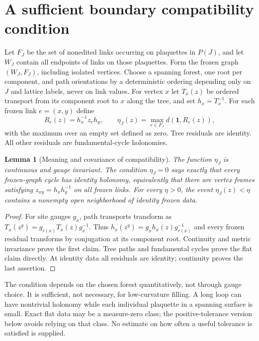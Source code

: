 \documentclass[11pt]{article}
\newtheorem{lemma}[theorem]{Lemma}
\theoremstyle{definition}
\theoremstyle{remark}
\newcommand{\one}{\mathbf1}
\begin{document}
\section{A sufficient boundary compatibility condition}
Let $F_J$ be the set of nonedited links occurring on plaquettes in $P(J)$,
and let $W_J$ contain all endpoints of links on those plaquettes. Form the
frozen graph $(W_J,F_J)$, including isolated vertices. Choose a spanning
forest, one root per component, and path orientations by a deterministic
ordering depending only on $J$ and lattice labels, never on link values.
For vertex $x$ let $T_x(z)$ be ordered transport from its component root
to $x$ along the tree, and set $h_x=T_x^{-1}$. For each frozen link
$e=(x,y)$ define
\begin{equation}
 R_e(z)=h_x^{-1}z_eh_y,\qquad
 \eta_J(z)=\max_{e\in F_J}d(\one,R_e(z)),\label{eq:residual}
\end{equation}
with the maximum over an empty set defined as zero. Tree residuals are
identity. All other residuals are fundamental-cycle holonomies.

\begin{lemma}[Meaning and covariance of compatibility]\label{lem:compatibility}
The function $\eta_J$ is continuous and gauge invariant. The condition
$\eta_J=0$ says exactly that every frozen-graph cycle has identity
holonomy, equivalently that there are vertex frames satisfying
$z_{xy}=h_xh_y^{-1}$ on all frozen links. For every $\eta>0$, the event
$\eta_J(z)<\eta$ contains a nonempty open neighborhood of identity
frozen data.
\end{lemma}
\begin{proof}
For site gauges $g_x$, path transports transform as
$T_x(z^g)=g_{r(x)}T_x(z)g_x^{-1}$. Thus
$h_x(z^g)=g_xh_x(z)g_{r(x)}^{-1}$ and every frozen residual transforms
by conjugation at its component root. Continuity and metric invariance
prove the first claim. Tree paths and fundamental cycles prove the flat
claim directly. At identity data all residuals are identity; continuity
proves the last assertion.
\end{proof}
The condition depends on the chosen forest quantitatively, not through
gauge choice. It is sufficient, not necessary, for low-curvature filling.
A long loop can have nontrivial holonomy while each individual plaquette
in a spanning surface is small. Exact flat data may be a measure-zero
class; the positive-tolerance version below avoids relying on that class.
No estimate on how often a useful tolerance is satisfied is supplied.
\end{document}
